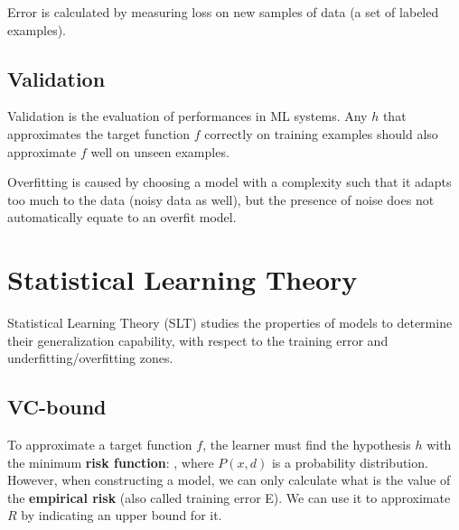 Error is calculated by measuring loss on new samples of data (a set of labeled examples).

\subsection{Validation}

Validation is the evaluation of performances in ML systems. Any $h$ that approximates the target function $f$ correctly on training examples should also approximate $f$ well on unseen examples.


\begin{center}
    \vspace{5mm}
    \vspace{5mm}
\end{center}

Overfitting is caused by choosing a model with a complexity such that it adapts too much to the data (noisy data as well), but the presence of noise does not automatically equate to an overfit model.


\section{Statistical Learning Theory}

Statistical Learning Theory (SLT) studies the properties of models to determine their generalization capability, with respect to the training error and underfitting/overfitting zones.

\subsection{VC-bound}

To approximate a target function $f$, the learner must find the hypothesis $h$ with the minimum \textbf{risk function}: , where $P(x,d)$ is a probability distribution. However, when constructing a model, we can only calculate what is the value of the \textbf{empirical risk}  (also called training error E). We can use it to approximate $R$ by indicating an upper bound for it.

